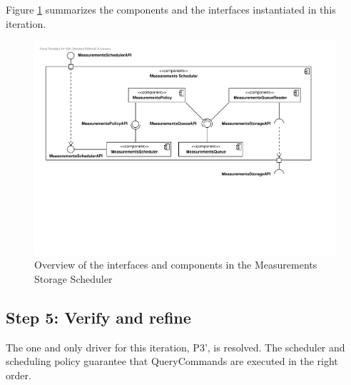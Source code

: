 \npar Figure \ref{fig:it3/interfaces} summarizes the components and the
interfaces instantiated in this iteration.

\begin{figure}[H]
	\begin{centering}
		\includegraphics[width=\textwidth]{figs/add-it3-interfaces.pdf}
		\caption{Overview of the interfaces and components in the Measurements Storage
		Scheduler}
		\label{fig:it3/interfaces}
	\end{centering}
\end{figure}

\subsection{Step 5: Verify and refine}
\label{add:it3/verification}

\npar The one and only driver for this iteration, P3', is resolved. The
scheduler and scheduling policy guarantee that QueryCommands are executed in the
right order.